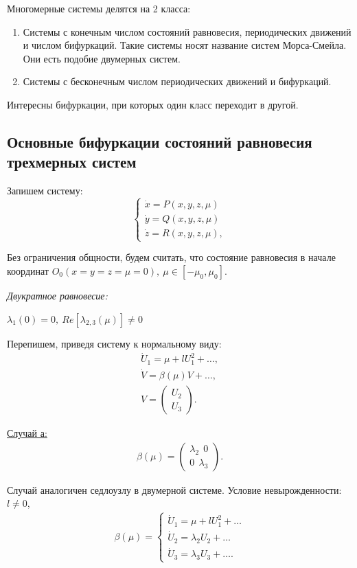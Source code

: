 Многомерные системы делятся на 2 класса:
\begin{enumerate}
	\item Системы с конечным числом состояний равновесия, периодических движений и числом бифуркаций. Такие системы носят название систем Морса-Смейла. Они есть подобие двумерных систем.
	\item Системы с бесконечным числом периодических движений и бифуркаций. 
\end{enumerate}

Интересны бифуркации, при которых один класс переходит в другой.

\subsection{Основные бифуркации состояний равновесия трехмерных систем}
Запишем систему:
\begin{equation}
	\begin{cases}
		\dot x = P(x, y, z, \mu) \\
		\dot y = Q(x, y, z, \mu) \\
		\dot z = R(x, y, z, \mu),
	\end{cases}
	\label{eq:86}	
\end{equation}

Без ограничения общности, будем считать, что состояние равновесия в начале координат $O_0(x=y=z=\mu=0),~\mu \in [-\mu_0,\mu_0]$.

\textit{Двукратное равновесие:}

$\lambda_1(0)=0,~Re[\lambda_{2,3}(\mu)] \neq 0$

Перепишем, приведя систему к нормальному виду:
\begin{gather*}
	\dot U_1 = \mu+lU_1^2+\dots, \\
	\dot V=\beta(\mu)V+\dots, \\
	V=
	\begin{pmatrix}
		U_2 \\
		U_3
	\end{pmatrix}
	.
\end{gather*}

\underline{Случай а:}
\begin{gather*}
	\beta(\mu)=
	\begin{pmatrix}
		\lambda_2~~0 \\
		0~~\lambda_3
	\end{pmatrix}
	.
\end{gather*}

Случай аналогичен седлоузлу в двумерной системе. Условие невырожденности: $l\neq 0$,
\begin{gather*}
	\beta(\mu)=
	\begin{cases}
		\dot U_1 = \mu+lU_1^2+\dots \\
		\dot U_2 = \lambda_2U_2+\dots \\
		\dot U_3 = \lambda_3U_3+\dots.
	\end{cases}
\end{gather*}

